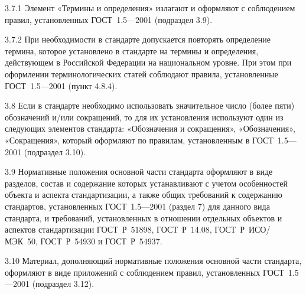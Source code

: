 \documentclass[12pt, twoside, final]{ruost}
\begin{document}
\begin{OST}
					\begin{stdquote}
						\par 3.7.1 Элемент «Термины и определения» излагают и оформляют с соблюдением правил, установленных ГОСТ~1.5—2001 (подраздел 3.9).
						\par [ГОСТ Р 1.5---2012]
					\end{stdquote}
					
					\begin{stdquote}
						\par 3.7.2 При необходимости в стандарте допускается повторять определение термина, которое установлено в стандарте на термины и определения, действующем в Российской Федерации на национальном уровне. При этом при оформлении терминологических статей соблюдают правила, установленные ГОСТ~1.5—2001 (пункт 4.8.4).
						\par [ГОСТ Р 1.5---2012]
					\end{stdquote}
					
					\begin{stdquote}
						\par 3.8 Если в стандарте необходимо использовать значительное число (более пяти) обозначений и/или сокращений, то для их установления используют один из следующих элементов стандарта: «Обозначения и сокращения», «Обозначения», «Сокращения», который оформляют по правилам, установленным в ГОСТ~1.5—2001 (подраздел 3.10).
						\par [ГОСТ Р 1.5---2012]
					\end{stdquote}
					
					\begin{stdquote}
						\par 3.9 Нормативные положения основной части стандарта оформляют в виде разделов, состав и содержание которых устанавливают с учетом особенностей объекта и аспекта стандартизации, а также общих требований к содержанию стандартов, установленных ГОСТ~1.5—2001 (раздел 7) для данного вида стандарта, и требований, установленных в отношении отдельных объектов и аспектов стандартизации ГОСТ~Р~51898, ГОСТ~Р~14.08, ГОСТ~Р~ИСО/МЭК~50, ГОСТ~Р~54930 и ГОСТ~Р~54937.
						\par [ГОСТ Р 1.5---2012]
					\end{stdquote}
					
					\begin{stdquote}
						\par 3.10 Материал, дополняющий нормативные положения основной части стандарта, оформляют в виде приложений с соблюдением правил, установленных ГОСТ~1.5—2001 (подраздел 3.12).
						\par [ГОСТ Р 1.5---2012]
					\end{stdquote}
					

\end{OST}
\end{document}
